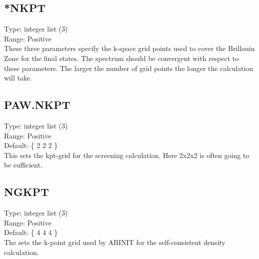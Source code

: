 \documentclass[12pt]{article}
\begin{document}
\subsection{*NKPT}
Type: integer list (3) \\
Range: Positive \\

These three parameters specify the k-space grid points used to cover the Brillouin Zone for the final
states.  The spectrum should be convergent with respect to these parameters. The larger the number of 
grid points the longer the calculation will take. 

\subsection{PAW.NKPT}
Type: integer list (3) \\
Range: Positive \\
Default: \{ 2 2 2 \} \\

This sets the kpt-grid for the screening calculation. Here 2x2x2 is often going to be sufficient.




\subsection{NGKPT}
Type: integer list (3) \\
Range: Positive \\
Default: \{ 4 4 4 \} \\

The sets the k-point grid used by ABINIT for the self-consistent density calculation.
\end{document}
